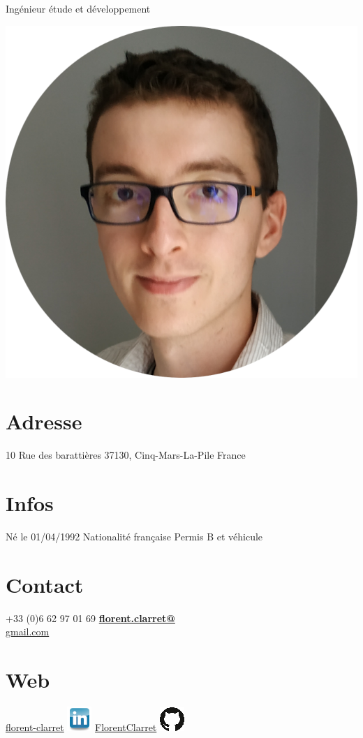 \documentclass[]{friggeri-cv}
\begin{document}
      {Ingénieur étude et développement}
      



\begin{aside}
  \includegraphics[scale=0.18]{img/photo.png}
  \section{Adresse}
    10 Rue des barattières
    37130, Cinq-Mars-La-Pile
    France
    ~
\section{Infos}
    Né le 01/04/1992
    Nationalité française
    Permis B et véhicule
    ~
  \section{Contact}
   +33 (0)6 62 97 01 69
    \href{mailto:florent.clarret@gmail.com}{\textbf{florent.clarret@}\\gmail.com}
    ~
  \section{Web}
	    \href{https://www.linkedin.com/in/florent-clarret/}{florent-clarret} \includegraphics{img/linkedin.png} 
	    \href{https://github.com/FlorentClarret}{FlorentClarret} \includegraphics{img/github.png} 
    ~

\end{aside}
\end{document}
